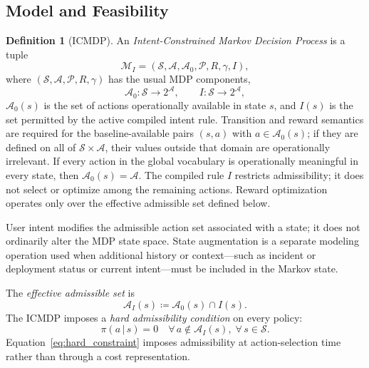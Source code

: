 \documentclass[journal]{IEEEtran}
\theoremstyle{definition}
\newtheorem{definition}{Definition}[section]
\newcommand{\cS}{\mathcal{S}}
\newcommand{\cA}{\mathcal{A}}
\newcommand{\cP}{\mathcal{P}}
\newcommand{\cM}{\mathcal{M}}
\newcommand{\given}{\,\vert\,}
\begin{document}
\subsection{Model and Feasibility}
\label{subsec:model}

\begin{definition}[ICMDP]
\label{def:icmdp}
An \emph{Intent-Constrained Markov Decision Process} is a tuple
\[
  \cM_I=(\cS,\cA,\cA_0,\cP,R,\gamma,I),
\]
where $(\cS,\cA,\cP,R,\gamma)$ has the usual MDP components,
\[
  \cA_0:\cS\to 2^{\cA},
  \qquad
  I:\cS\to 2^{\cA},
\]
$\cA_0(s)$ is the set of actions operationally available in state $s$, and
$I(s)$ is the set permitted by the active compiled intent rule. Transition
and reward semantics are required for the baseline-available pairs
$(s,a)$ with $a\in\cA_0(s)$; if they are defined on all of
$\cS\times\cA$, their values outside that domain are operationally irrelevant.
If every action in the global vocabulary is operationally meaningful in
every state, then $\cA_0(s)=\cA$. The compiled rule $I$ restricts admissibility;
it does not select or optimize among the remaining actions. Reward optimization
operates only over the effective admissible set defined below.
\end{definition}

User intent modifies the admissible action set associated with a state;
it does not ordinarily alter the MDP state space. State augmentation is a
separate modeling operation used when additional history or context---such as
incident or deployment status
or current intent---must be included in the Markov state.

The \emph{effective admissible set} is
\begin{equation}
  \cA_I(s)\coloneqq\cA_0(s)\cap I(s).
  \label{eq:feasible_set}
\end{equation}
The ICMDP imposes a \emph{hard admissibility condition} on every policy:
\begin{equation}
  \pi(a \given s) = 0 \quad
  \forall\, a \notin \cA_I(s),\;
  \forall\, s \in \cS.
  \label{eq:hard_constraint}
\end{equation}
Equation~\eqref{eq:hard_constraint} imposes admissibility at action-selection
time rather than through a cost representation.
\end{document}
